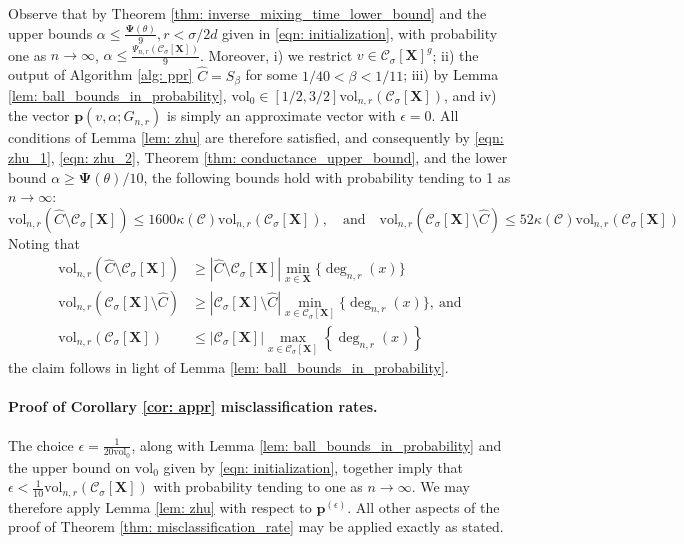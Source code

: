 \documentclass{article}
\let\pprspace\relax
\newcommand{\set}[1]{\left\{#1\right\}}
\newcommand{\vol}{\mathrm{vol}}
\newcommand{\abs}[1]{\left \lvert #1 \right \rvert}
\newcommand{\1}{\mathbf{1}}
\newcommand{\pbf}{\mathbf{p}}
\newcommand{\Xbf}{\mathbf{X}}
\newcommand{\Cset}{\mathcal{C}}
\newcommand{\Csig}{\Cset_{\sigma}}
\newcommand{\pprspace}{{\sc PPR~}}
\theoremstyle{aldenthm}
\begin{document}
Observe that by Theorem \ref{thm: inverse_mixing_time_lower_bound} and the upper bounds $\alpha \leq \frac{\mathbf{\Psi}(\theta)}{9}, r < \sigma/2d$ given in \eqref{eqn: initialization}, with probability one as $n \to \infty$, $\alpha \leq \frac{\Psi_{n,r}(\Csig[\Xbf])}{9}$. Moreover, i) we restrict $v \in \Csig[\Xbf]^g$; ii) the output of Algorithm \ref{alg: ppr} $\widehat{C} = S_{\beta}$ for some $1/40 < \beta < 1/11$; iii) by Lemma \ref{lem: ball_bounds_in_probability}, $\vol_0 \in [1/2,3/2]\vol_{n,r}(\Csig[\Xbf])$, and iv) the \pprspace vector $\pbf(v,\alpha;G_{n,r})$ is simply an approximate \pprspace vector with $\epsilon = 0$. All conditions of Lemma \ref{lem: zhu} are therefore satisfied, and consequently by \eqref{eqn: zhu_1}, \eqref{eqn: zhu_2}, Theorem \ref{thm: conductance_upper_bound}, and the lower bound $\alpha \geq \mathbf{\Psi}(\theta)/10$, the following bounds hold with probability tending to 1 as $n \to \infty$:
\begin{equation*}
\vol_{n,r}(\widehat{C} \setminus \Csig[\Xbf]) \leq 1600 \kappa(\Cset) \vol_{n,r}(\Csig[\Xbf]), \quad \textrm{and} \quad  \vol_{n,r}(\Csig[\Xbf] \setminus \widehat{C}) \leq 52 \kappa(\Cset) \vol_{n,r}(\Csig[\Xbf])
\end{equation*}
Noting that
\begin{align*}
\vol_{n,r}(\widehat{C} \setminus \Csig[\Xbf]) & \geq \abs{\widehat{C} \setminus \Csig[\Xbf]} \min_{x \in \Xbf} \{\deg_{n,r}(x)\} \\
\vol_{n,r}(\Csig[\Xbf] \setminus \widehat{C}) & \geq \abs{\Csig[\Xbf] \setminus \widehat{C}} \min_{x \in \Csig[\Xbf]} \{\deg_{n,r}(x)\},~ \textrm{and} \\
\vol_{n,r}(\Csig[\Xbf]) & \leq \abs{\Csig[\Xbf]} \max_{x \in \Csig[\Xbf]} \set{\deg_{n,r}(x)}
\end{align*}
the claim follows in light of Lemma \ref{lem: ball_bounds_in_probability}.

\paragraph{Proof of Corollary \ref{cor: appr} misclassification rates.}

The choice $\epsilon = \frac{1}{20 \vol_0}$, along with Lemma \ref{lem: ball_bounds_in_probability} and the upper bound on $\vol_0$ given by \eqref{eqn: initialization}, together imply that $\epsilon < \frac{1}{10}\vol_{n,r}(\Csig[\Xbf])$ with probability tending to one as $n \to \infty$. We may therefore apply Lemma \ref{lem: zhu} with respect to $\pbf^{(\epsilon)}$. All other aspects of the proof of Theorem \ref{thm: misclassification_rate} may be applied exactly as stated.
\end{document}
